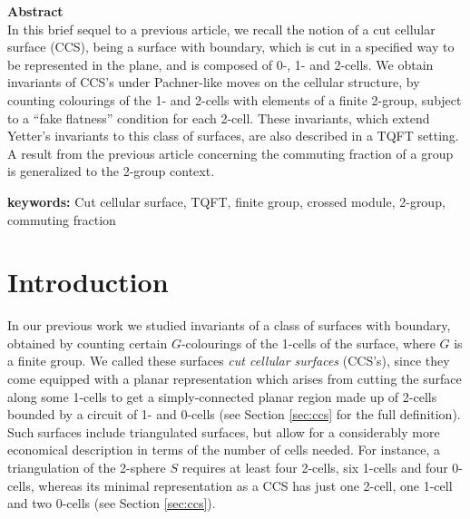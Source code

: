 \documentclass[a4paper,11pt]{article}
\begin{document}

\noindent
\textbf{Abstract} \\
In this brief sequel to a previous article, we recall the notion of a cut cellular surface (CCS), being a surface with boundary, which is cut in a specified way to be represented in the plane, and is composed of 0-, 1- and 2-cells. We obtain invariants of CCS's under Pachner-like moves on the cellular structure, by counting colourings of the 1- and 2-cells  with elements of a finite 2-group, subject to a ``fake flatness'' condition for each 2-cell. These invariants, which extend Yetter's invariants to this class of surfaces, are also described in a TQFT setting. A result from the previous article concerning the commuting fraction of a group is generalized to the 2-group context.


\medskip


\medskip



\noindent\textbf{keywords:} Cut cellular surface, TQFT, finite group, crossed module, 2-group, commuting fraction


\newpage

\section{Introduction}


In our previous work \cite{bp1} we studied invariants of a class of surfaces with boundary, obtained by counting certain $G$-colourings of the 1-cells of the surface, where $G$ is a finite group. We called these surfaces \emph{cut cellular surfaces} (CCS's), since they come equipped with a planar representation which arises from cutting the surface along some 1-cells to get a simply-connected planar region made up of 2-cells bounded by a circuit of 1- and 0-cells (see Section \ref{sec:ccs} for the full definition). Such surfaces include triangulated surfaces, but allow for a considerably more economical description in terms of the number of cells needed.  For instance, a triangulation of the 2-sphere $S$ requires at least four 2-cells, six 1-cells and four 0-cells, whereas its minimal representation as a CCS has just one 2-cell, one 1-cell and two 0-cells (see Section \ref{sec:ccs}). 
\end{document}
